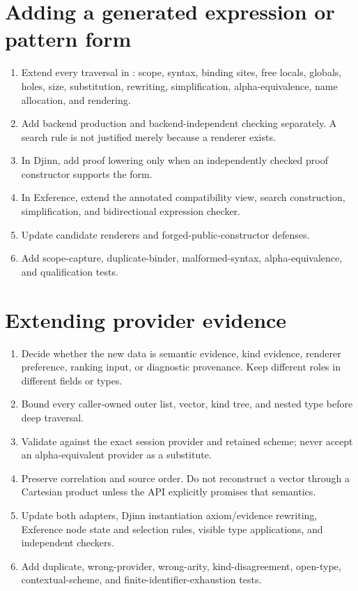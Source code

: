 \documentclass[10pt,letterpaper,oneside]{report}
\newcommand{\code}[1]{\texttt{\detokenize{#1}}}
\begin{document}
\section{Adding a generated expression or pattern form}

\begin{enumerate}
  \item Extend every traversal in \code{Generated}: scope, syntax, binding sites, free locals, globals, holes, size, substitution, rewriting, simplification, alpha-equivalence, name allocation, and rendering.
  \item Add backend production and backend-independent checking separately. A search rule is not justified merely because a renderer exists.
  \item In Djinn, add proof lowering only when an independently checked proof constructor supports the form.
  \item In Exference, extend the annotated compatibility view, search construction, simplification, and bidirectional expression checker.
  \item Update candidate renderers and forged-public-constructor defenses.
  \item Add scope-capture, duplicate-binder, malformed-syntax, alpha-equivalence, and qualification tests.
\end{enumerate}

\section{Extending provider evidence}

\begin{enumerate}
  \item Decide whether the new data is semantic evidence, kind evidence, renderer preference, ranking input, or diagnostic provenance. Keep different roles in different fields or types.
  \item Bound every caller-owned outer list, vector, kind tree, and nested type before deep traversal.
  \item Validate against the exact session provider and retained scheme; never accept an alpha-equivalent provider as a substitute.
  \item Preserve correlation and source order. Do not reconstruct a vector through a Cartesian product unless the API explicitly promises that semantics.
  \item Update both adapters, Djinn instantiation axiom/evidence rewriting, Exference node state and selection rules, visible type applications, and independent checkers.
  \item Add duplicate, wrong-provider, wrong-arity, kind-disagreement, open-type, contextual-scheme, and finite-identifier-exhaustion tests.
\end{enumerate}
\end{document}
